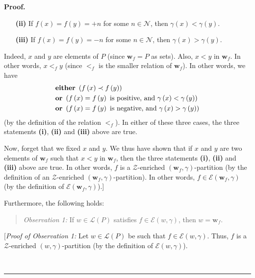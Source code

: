 \documentclass[numbers=enddot,12pt,final,onecolumn,notitlepage]{scrartcl}%
\theoremstyle{definition}
\newenvironment{statement}{\begin{quote}}{\end{quote}}
\newenvironment{proof}[1][Proof]{\noindent\textbf{#1.} }{\ \rule{0.5em}{0.5em}}
\newenvironment{verlong}{}{}
\begin{document}
\begin{verlong}
\begin{proof}
\begin{enumerate}
\item[\textbf{(ii)}] If $f\left(  x\right)  =f\left(  y\right)  =+n$ for some
$n\in\mathcal{N}$, then $\gamma\left(  x\right)  <\gamma\left(  y\right)  $.

\item[\textbf{(iii)}] If $f\left(  x\right)  =f\left(  y\right)  =-n$ for some
$n\in\mathcal{N}$, then $\gamma\left(  x\right)  >\gamma\left(  y\right)  $.
\end{enumerate}

Indeed, $x$ and $y$ are elements of $P$ (since $\mathbf{w}_{f}=P$ as sets).
Also, $x<y$ in $\mathbf{w}_{f}$. In other words, $x<_{f}y$ (since $<_{f}$ is
the smaller relation of $\mathbf{w}_{f}$). In other words, we have%
\begin{align*}
& \text{\textbf{either} }\left(  f\left(  x\right)  \prec f\left(  y\right)
\right)  \\
& \text{\textbf{or} }\left(  f\left(  x\right)  =f\left(  y\right)  \text{ is
positive, and }\gamma\left(  x\right)  <\gamma\left(  y\right)  \right)  \\
& \text{\textbf{or} }\left(  f\left(  x\right)  =f\left(  y\right)  \text{ is
negative, and }\gamma\left(  x\right)  >\gamma\left(  y\right)  \right)
\end{align*}
(by the definition of the relation $<_{f}$). In either of these three cases,
the three statements \textbf{(i)}, \textbf{(ii)} and \textbf{(iii)} above are true.

Now, forget that we fixed $x$ and $y$. We thus have shown that if $x$ and $y$
are two elements of $\mathbf{w}_{f}$ such that $x<y$ in $\mathbf{w}_{f}$, then
the three statements \textbf{(i)}, \textbf{(ii)} and \textbf{(iii)} above are
true. In other words, $f$ is a $\mathcal{Z}$-enriched $\left(  \mathbf{w}%
_{f},\gamma\right)  $-partition (by the definition of an $\mathcal{Z}%
$-enriched $\left(  \mathbf{w}_{f},\gamma\right)  $-partition). In other
words, $f\in\mathcal{E}\left(  \mathbf{w}_{f},\gamma\right)  $ (by the
definition of $\mathcal{E}\left(  \mathbf{w}_{f},\gamma\right)  $).]

Furthermore, the following holds:

\begin{statement}
\textit{Observation 1:} If $w\in\mathcal{L}\left(  P\right)  $ satisfies
$f\in\mathcal{E}\left(  w,\gamma\right)  $, then $w=\mathbf{w}_{f}$.
\end{statement}

[\textit{Proof of Observation 1:} Let $w\in\mathcal{L}\left(  P\right)  $ be
such that $f\in\mathcal{E}\left(  w,\gamma\right)  $. Thus, $f$ is a
$\mathcal{Z}$-enriched $\left(  w,\gamma\right)  $-partition (by the
definition of $\mathcal{E}\left(  w,\gamma\right)  $).


\end{proof}
\end{verlong}
\end{document}
